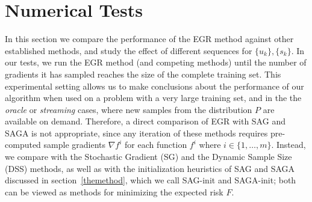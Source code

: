 \documentclass[11pt]{article}
\begin{document}
%   
  
\section{Numerical Tests} \label{numerical}
 
In this section we compare the performance of the EGR method against other established methods, and study the effect of different  sequences for $\{u_k\}, \{s_k\}$. In our tests, we run the EGR method (and competing methods) until the number of gradients it has sampled reaches the size of the complete training set.  This experimental setting allows us to make conclusions about the performance of our algorithm when used on a problem with a very large training set, and in the the \emph{oracle} or \emph{streaming} cases,  where new samples from the distribution $P$ are available on demand. 
Therefore, a direct comparison of EGR with  SAG and SAGA is not appropriate, since any iteration of these methods requires pre-computed sample gradients $\nabla f^i$ for each function $f^i$ where $i \in  \{1 , \ldots, m \} $. Instead, we compare with the Stochastic Gradient (SG) and the Dynamic Sample Size (DSS) methods, as well as with the initialization heuristics of SAG and SAGA discussed in section~\ref{themethod}, which we call SAG-init and SAGA-init; both can be viewed as methods for minimizing the expected risk $F$. 
\end{document}
